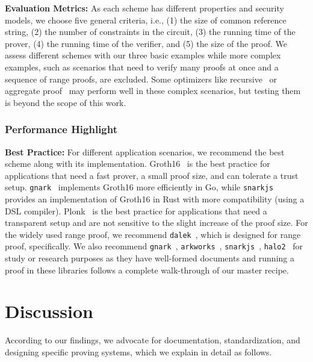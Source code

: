 \documentclass[letterpaper,twocolumn,10pt]{article}
\theoremstyle{definition}
\newcommand{\mypara}[1]{\noindent\textbf{{#1: }}}
\newcommand{\lib}[1]{\texttt{#1}\xspace}
\begin{document}
\mypara{Evaluation Metrics} As each scheme has different properties and security models, we choose five general criteria, i.e., (1) the size of common reference string, (2) the number of constraints in the circuit, (3) the running time of the prover, (4) the running time of the verifier, and (5) the size of the proof. We assess different schemes with our three basic examples while more complex examples, such as scenarios that need to verify many proofs at once and a sequence of range proofs, are excluded. Some optimizers like recursive~\cite{halo2} or aggregate proof~\cite{eagen2024bulletproofs++} may perform well in these complex scenarios, but testing them is beyond the scope of this work.
\subsubsection{Performance Highlight}

\mypara{Best Practice} For different application scenarios, we recommend the best scheme along with its implementation. Groth16~\cite{groth2016size} is the best practice for applications that need a fast prover, a small proof size, and can tolerate a trust setup. \lib{gnark}~\cite{gnark} implements Groth16 more efficiently in Go, while \lib{snarkjs}~\cite{snarkjs} provides an implementation of Groth16 in Rust with more compatibility (using a DSL compiler).
Plonk~\cite{gabizon2019plonk} is the best practice for applications that need a transparent setup and are not sensitive to the slight increase of the proof size. For the widely used range proof, we recommend \lib{dalek}~\cite{dalek-bulletproofs}, which is designed for range proof, specifically. We also recommend \lib{gnark}~\cite{gnark}, \lib{arkworks}~\cite{arkworks}, \lib{snarkjs}~\cite{snarkjs}, \lib{halo2}~\cite{halo2} for study or research purposes as they have well-formed documents and running a proof in these libraries follows a complete walk-through of our master recipe.

\section{Discussion}
According to our findings, we advocate for documentation, standardization, and designing specific proving systems, which we explain in detail as follows.
\end{document}
